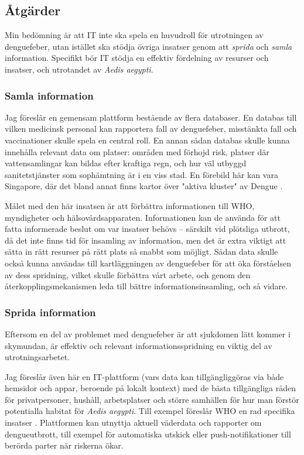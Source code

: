 \documentclass{article}
\begin{document}
\subsection{Åtgärder}

Min bedömning är att IT inte ska spela en huvudroll för utrotningen av denguefeber, utan istället ska stödja övriga insatser genom att \emph{sprida} och \emph{samla} information. Specifikt bör IT stödja en effektiv fördelning av resurser och insatser, och utrotandet av \emph{Aedis aegypti}.

\subsubsection{Samla information}

Jag föreslår en gemensam plattform bestående av flera databaser. En databas till vilken medicinsk personal kan rapportera fall av denguefeber, misstänkta fall och vaccinationer skulle spela en central roll. En annan sådan databas skulle kunna innehålla relevant data om platser: områden med förhojd risk, platser där vattensamlingar kan bildas efter kraftiga regn, och hur väl utbyggd sanitetstjänster som sophämtning är i en viss stad. En förebild här kan vara Singapore, där det bland annat finns kartor över "aktiva kluster" av Dengue \cite{Singapore:clusters}.

Målet med den här insatsen är att förbättra informationen till WHO, myndigheter och hälsovårds\-apparaten. Informationen kan de använda för att fatta informerade beslut om var insatser behövs – särskilt vid plötsliga utbrott, då det inte finns tid för insamling av information, men det är extra viktigt att sätta in rätt resurser på rätt plats så snabbt som möjligt. Sådan data skulle också kunna användas till kartläggningen av denguefeber för att öka förståelsen av dess spridning, vilket skulle förbättra vårt arbete, och genom den återkopplingsmekanismen leda till bättre informationsinsamling, och så vidare.

\subsubsection{Sprida information}

Eftersom en del av problemet med denguefeber är att sjukdomen lätt kommer i skymundan, är effektiv och relevant informationsspridning en viktig del av utrotningsarbetet.

Jag föreslår även här en IT-plattform (vars data kan tillgängliggöras via både hemsidor och appar, beroende på lokalt kontext) med de bästa tillgängliga råden för privatpersoner, hushåll, arbetsplatser och större samhällen för hur man förstör potentialla habitat för \emph{Aedis aegypti}. Till exempel föreslår WHO en rad specifika insatser \cite[s. 60-64]{WHO:2009}. Plattformen kan utnyttja aktuell väderdata och rapporter om dengueutbrott, till exempel för automatiska utskick eller push-notifikationer till berörda parter när riskerna ökar.
\end{document}
